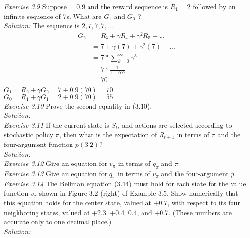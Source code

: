 \documentclass{article}
\begin{document}
\noindent \textit{Exercise 3.9} Suppose = 0.9 and the reward sequence is $R_{1} = 2$ followed by an infinite sequence of 7s. What are $G_{1}$ and $G_{0}$ ? \\
\textit{Solution: } The sequence is $2, 7, 7, 7, ...$.\\
\begin{align*}
  G_{2} &= R_{3} + \gamma R_{4} + \gamma^{2} R_{5} + ... \\
        &= 7 + \gamma (7) + \gamma^{2} (7) + ... \\
        &= 7 * \displaystyle\sum_{k=0}^{\infty} \gamma^{k} \\
        &= 7 * \frac{1}{1-0.9} \\
        &= 70 \\ 
\end{align*}
$G_{1} = R_{2} + \gamma G_{2} = 7 + 0.9(70) = 70$ \\
$G_{0} = R_{1} + \gamma G_{1} = 2 + 0.9(70) = 65$ \\

\noindent \textit{Exercise 3.10} Prove the second equality in (3.10). \\
\textit{Solution:} \\

\noindent \textit{Exercise 3.11} If the current state is $S_{t}$, and actions are selected according to stochastic policy $\pi$, then what is the expectation of $R_{t+1}$ in terms of $\pi$ and the four-argument function $p(3.2)$? \\
\textit{Solution:} \\

\noindent \textit{Exercise 3.12} Give an equation for $v_{\pi}$ in terms of $q_{\pi}$ and $\pi$. \\

\noindent \textit{Exercise 3.13} Give an equation for $q_{\pi}$ in terms of $v_{\pi}$ and the four-argument $p$. \\

\noindent \textit{Exercise 3.14} The Bellman equation (3.14) must hold for each state for the value function $v_{\pi}$ shown in Figure 3.2 (right) of Example 3.5. Show numerically that this equation holds for the center state, valued at +0.7, with respect to its four neighboring states, valued at +2.3, +0.4, 0.4, and +0.7. (These numbers are accurate only to one decimal place.) \\
\textit{Solution:} \\
\end{document}
